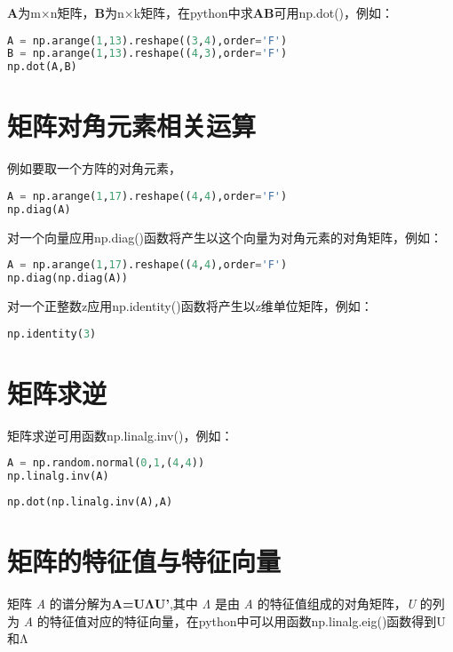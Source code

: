 \documentclass[UTF8,a4paper,12pt]{ctexart}  %
\begin{document}
\textbf{A}为m×n矩阵，\textbf{B}为n×k矩阵，在python中求\textbf{AB}可用np.dot()，例如：

\begin{lstlisting}[language=Python]
A = np.arange(1,13).reshape((3,4),order='F')
B = np.arange(1,13).reshape((4,3),order='F')
np.dot(A,B)
\end{lstlisting}

\section{矩阵对角元素相关运算}

例如要取一个方阵的对角元素，

\begin{lstlisting}[language=Python]
A = np.arange(1,17).reshape((4,4),order='F')
np.diag(A)
\end{lstlisting}

对一个向量应用np.diag()函数将产生以这个向量为对角元素的对角矩阵，例如：

\begin{lstlisting}[language=Python]
A = np.arange(1,17).reshape((4,4),order='F')
np.diag(np.diag(A))
\end{lstlisting}

对一个正整数z应用np.identity()函数将产生以z维单位矩阵，例如：

\begin{lstlisting}[language=Python]
np.identity(3)
\end{lstlisting}

\section{矩阵求逆}

矩阵求逆可用函数np.linalg.inv()，例如：

\begin{lstlisting}[language=Python]
A = np.random.normal(0,1,(4,4))
np.linalg.inv(A)
\end{lstlisting}

\begin{lstlisting}[language=Python]
np.dot(np.linalg.inv(A),A)
\end{lstlisting}

\section{矩阵的特征值与特征向量}

矩阵 \emph{A} 的谱分解为\textbf{A=UΛU'},其中 \emph{Λ} 是由 \emph{A} 的特征值组成的对角矩阵，\emph{U} 的列为 \emph{A} 的特征值对应的特征向量，在python中可以用函数np.linalg.eig()函数得到U和Λ
\end{document}
